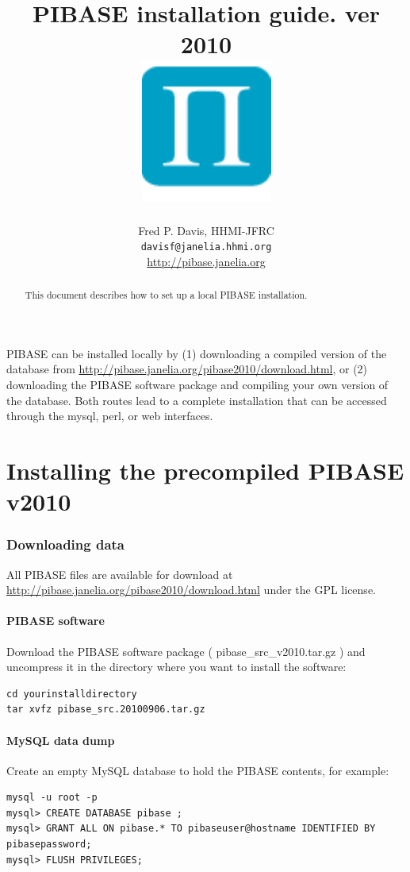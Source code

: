 \documentclass[11pt]{article}
\title{PIBASE installation guide. ver 2010\\
\includegraphics[scale=0.5]{pibase_blue_web.pdf}}
\author{Fred P. Davis, HHMI-JFRC\\{\tt davisf@janelia.hhmi.org}\\\url{http://pibase.janelia.org}}
\begin{document}
\maketitle

\begin{abstract}
This document describes how to set up a local PIBASE installation.
\end{abstract}

PIBASE can be installed locally by (1) downloading a compiled version of the database from \url{http://pibase.janelia.org/pibase2010/download.html}, or (2) downloading the PIBASE software package and compiling your own version of the database. Both routes lead to a complete installation that can be accessed through the mysql, perl, or web interfaces.

\part{Installing the precompiled PIBASE v2010}

\section{Downloading data}

All PIBASE files are available for download at \url{http://pibase.janelia.org/pibase2010/download.html} under the GPL license.

\subsection{PIBASE software}

Download the PIBASE software package ( pibase\_src\_v2010.tar.gz ) and uncompress it in the directory where you want to install the software:
\begin{verbatim}
cd yourinstalldirectory
tar xvfz pibase_src.20100906.tar.gz
\end{verbatim}


\subsection{MySQL data dump}

Create an empty MySQL database to hold the PIBASE contents, for example:
\begin{verbatim}
mysql -u root -p
mysql> CREATE DATABASE pibase ;
mysql> GRANT ALL ON pibase.* TO pibaseuser@hostname IDENTIFIED BY pibasepassword;
mysql> FLUSH PRIVILEGES;
\end{verbatim}
\end{document}
